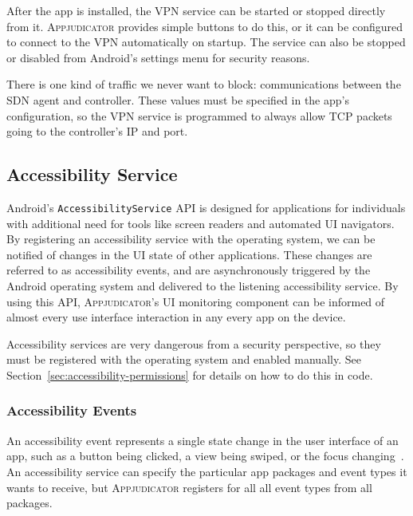 After the app is installed, the VPN service can be started or stopped directly
from it. \textsc{Appjudicator} provides simple buttons to do this, or it can be
configured to connect to the VPN automatically on startup. The service can also
be stopped or disabled from Android's settings menu for security reasons.

There is one kind of traffic we never want to block: communications between the
SDN agent and controller. These values must be specified in the app's
configuration, so the VPN service is programmed to always allow TCP packets
going to the controller's IP and port.

\subsection{Accessibility Service}
\label{sec:implementation-accessibility-service}

Android's \texttt{AccessibilityService} API is designed for applications for
individuals with additional need for tools like screen readers and automated UI
navigators. By registering an accessibility service with the operating system,
we can be notified of changes in the UI state of other applications. These
changes are referred to as accessibility events, and are asynchronously
triggered by the Android operating system and delivered to the listening
accessibility service. By using this API, \textsc{Appjudicator}'s UI monitoring
component can be informed of almost every use interface interaction in any every
app on the device.

Accessibility services are very dangerous from a security perspective, so they
must be registered with the operating system and enabled manually. See
Section~\ref{sec:accessibility-permissions} for details on how to do this in
code.

\subsubsection{Accessibility Events}
\label{sec:accessibility-events}

An accessibility event represents a single state change in the user interface of
an app, such as a button being clicked, a view being swiped, or the focus
changing~\cite{accessibilityserviceguide}. An accessibility service can specify
the particular app packages and event types it wants to receive, but
\textsc{Appjudicator} registers for all all event types from all packages.

